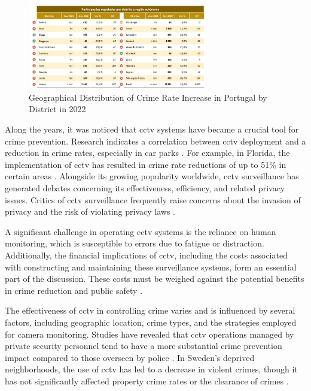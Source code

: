 \begin{figure}[h]
    \centering 
    \includegraphics[width=0.7\textwidth]{figs/geo-crimes-rate.png} 
    \caption{Geographical Distribution of Crime Rate Increase in Portugal by District in 2022 \cite{rfc41}}
    \label{fig:geo-crimes}
\end{figure}

Along the years, it was noticed that \ac{cctv} systems have became a 
crucial tool for crime prevention. Research indicates a 
correlation between \ac{cctv} deployment and a reduction in crime rates, especially in car parks 
\cite{rfc33}. For example, in Florida, the implementation of \ac{cctv} has resulted in 
crime rate reductions of up to 51\% in certain areas \cite{rfc34}. Alongside its growing 
popularity worldwide, \ac{cctv} surveillance has generated debates concerning its effectiveness, efficiency, and 
related privacy issues. Critics of \ac{cctv} surveillance frequently raise concerns about the invasion of privacy 
and the risk of violating privacy laws \cite{rfc38}.

A significant challenge in operating \ac{cctv} systems is the reliance on human monitoring, which is susceptible to errors due to fatigue or distraction. Additionally, the financial implications of \ac{cctv}, including the costs associated with constructing and maintaining these surveillance systems, form an essential part of the discussion. These costs must be weighed against the potential benefits in crime reduction and public safety \cite{rfc38}. 

The effectiveness of \ac{cctv} in controlling crime varies and is influenced by several factors, including geographic location, crime types, and the strategies employed for camera monitoring. Studies have revealed that \ac{cctv} operations managed by private security personnel tend to have a more substantial crime prevention impact compared to those overseen by police \cite{rfc36}. In Sweden's deprived neighborhoods, the use of \ac{cctv} has led to a decrease in violent crimes, though it has not significantly affected property crime rates or the clearance of crimes \cite{rfc35}.

